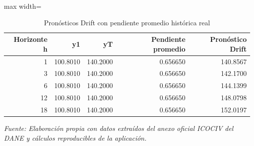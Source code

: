 \begin{table}[H]
\centering
\caption{Pronósticos Drift con pendiente promedio histórica real}
\label{tab:ejemplo_drift_vias_urbanas}
\scriptsize
\begin{adjustbox}{max width=\linewidth}
\begin{tabular}{rrrrr}
\toprule
Horizonte h & y1 & yT & Pendiente promedio & Pronóstico Drift \\
\midrule
1 & 100.8010 & 140.2000 & 0.656650 & 140.8567 \\
3 & 100.8010 & 140.2000 & 0.656650 & 142.1700 \\
6 & 100.8010 & 140.2000 & 0.656650 & 144.1399 \\
12 & 100.8010 & 140.2000 & 0.656650 & 148.0798 \\
18 & 100.8010 & 140.2000 & 0.656650 & 152.0197 \\
\bottomrule
\end{tabular}
\end{adjustbox}
\par\footnotesize\textit{Fuente: Elaboración propia con datos extraídos del anexo oficial ICOCIV del DANE y cálculos reproducibles de la aplicación.}
\end{table}
